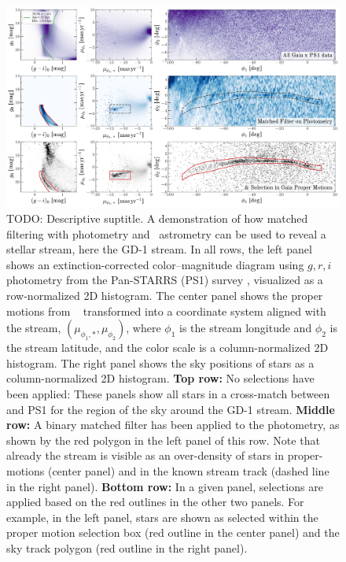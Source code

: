 \documentclass[final,5p,times,twocolumn,authoryear]{elsarticle}
\begin{document}
\begin{figure}[t!]
    \begin{center}
    \includegraphics[width=1\textwidth]{gd1-filter-demo.pdf}
    \end{center}
    \caption{%
    TODO: Descriptive suptitle.
    A demonstration of how matched filtering with photometry and \gaia\ astrometry can
    be used to reveal a stellar stream, here the GD-1 stream.
    In all rows, the left panel shows an extinction-corrected color--magnitude diagram
    using $g, r, i$ photometry from the Pan-STARRS (PS1) survey \citep{chambers:2016},
    visualized as a row-normalized 2D histogram.
    The center panel shows the proper motions from \gaia\  \citep{gaiadr3}
    transformed into a coordinate system aligned with the stream, $(\mu_{\phi_1, *},
    \mu_{\phi_2})$, where $\phi_1$ is the stream longitude and $\phi_2$ is the stream
    latitude, and the color scale is a column-normalized 2D histogram.
    The right panel shows the sky positions of stars as a column-normalized 2D
    histogram.
    \textbf{Top row:} No selections have been applied: These panels show all stars in a
    cross-match between \gaia\  and PS1 for the region of the sky around the GD-1
    stream.
    \textbf{Middle row:} A binary matched filter has been applied to the photometry, as
    shown by the red polygon in the left panel of this row.
    Note that already the stream is visible as an over-density of stars in
    proper-motions (center panel) and in the known stream track (dashed line in the
    right panel).
    \textbf{Bottom row:} In a given panel, selections are applied based on the red
    outlines in the other two panels.
    For example, in the left panel, stars are shown as selected within the proper motion
    selection box (red outline in the center panel) and the sky track polygon (red
    outline in the right panel).
    \label{fig:gd1-demo}
    }
\end{figure}
\end{document}
